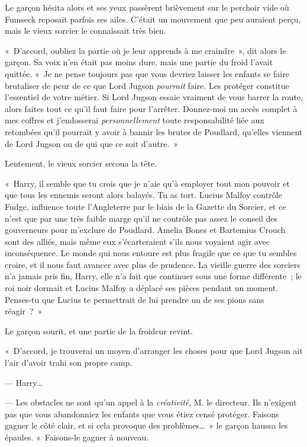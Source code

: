 Le garçon hésita alors et ses yeux passèrent brièvement sur le perchoir vide où Fumseck reposait parfois ses ailes.
C'était un mouvement que peu auraient perçu, mais le vieux sorcier le connaissait très bien.

«~D'accord, oubliez la partie où je leur apprends à me craindre~», dit alors le garçon.
Sa voix n'en était pas moins dure, mais une partie du froid l'avait quittée.
«~Je ne pense toujours pas que vous devriez laisser les enfants se faire brutaliser de peur de ce que Lord Jugson \emph{pourrait} faire.
Les protéger constitue l'essentiel de votre métier.
Si Lord Jugson essaie vraiment de vous barrer la route, alors faites tout ce qu'il faut faire pour l'arrêter.
Donnez-moi un accès complet à mes coffres et j'endosserai \emph{personnellement} toute responsabilité liée aux retombées qu'il pourrait y avoir à bannir les brutes de Poudlard, qu'elles viennent de Lord Jugson ou de qui que ce soit d'autre.~»

Lentement, le vieux sorcier secoua la tête.

«~Harry, il semble que tu crois que je n'aie qu'à employer tout mon pouvoir et que tous les ennemis seront alors balayés.
Tu as tort.
Lucius Malfoy contrôle Fudge, influence toute l'Angleterre par le biais de la Gazette du Sorcier, et ce n'est que par une très faible marge qu'il ne contrôle pas assez le conseil des gouverneurs pour m'exclure de Poudlard.
Amelia Bones et Bartemius Crouch sont des alliés, mais même eux s'écarteraient s'ils nous voyaient agir avec inconséquence.
Le monde qui nous entoure est plus fragile que ce que tu sembles croire, et il nous faut avancer avec plus de prudence.
La vieille guerre des sorciers n'a jamais pris fin, Harry, elle n'a fait que continuer sous une forme différente~; le roi noir dormait et Lucius Malfoy a déplacé ses pièces pendant un moment.
Penses-tu que Lucius te permettrait de lui prendre un de ses pions sans réagir~?~»

Le garçon sourit, et une partie de la froideur revint.

«~D'accord, je trouverai un moyen d'arranger les choses pour que Lord Jugson ait l'air d'avoir trahi son propre camp.

--- Harry…

--- Les obstacles ne sont qu'un appel à la \emph{créativité}, M. le directeur.
Ils n'exigent pas que vous abandonniez les enfants que vous étiez censé protéger.
Faisons gagner le côté clair, et si cela provoque des problèmes…~»
le garçon haussa les épaules.
«~Faisons-le gagner à nouveau.


